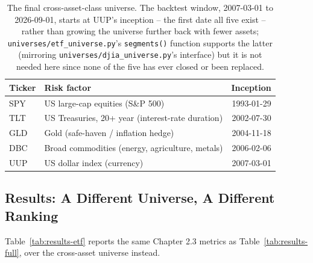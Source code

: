 \documentclass[11pt]{article}
\begin{document}
\begin{table}[h]
\centering
\begin{tabular}{llr}
\toprule
Ticker & Risk factor & Inception \\
\midrule
SPY & US large-cap equities (S\&P 500) & 1993-01-29 \\
TLT & US Treasuries, 20+ year (interest-rate duration) & 2002-07-30 \\
GLD & Gold (safe-haven / inflation hedge) & 2004-11-18 \\
DBC & Broad commodities (energy, agriculture, metals) & 2006-02-06 \\
UUP & US dollar index (currency) & 2007-03-01 \\
\bottomrule
\end{tabular}
\caption{The final cross-asset-class universe. The backtest window,
2007-03-01 to 2026-09-01, starts at UUP's inception -- the first date
all five exist -- rather than growing the universe further back with
fewer assets; \texttt{universes/etf\_universe.py}'s \texttt{segments()}
function supports the latter (mirroring
\texttt{universes/djia\_universe.py}'s interface) but it is not needed
here since none of the five has ever closed or been replaced.}
\label{tab:etf-universe}
\end{table}

\subsection{Results: A Different Universe, A Different Ranking}
\label{sec:etf-results}

Table~\ref{tab:results-etf} reports the same Chapter 2.3 metrics as
Table~\ref{tab:results-full}, over the cross-asset universe instead.
\end{document}
